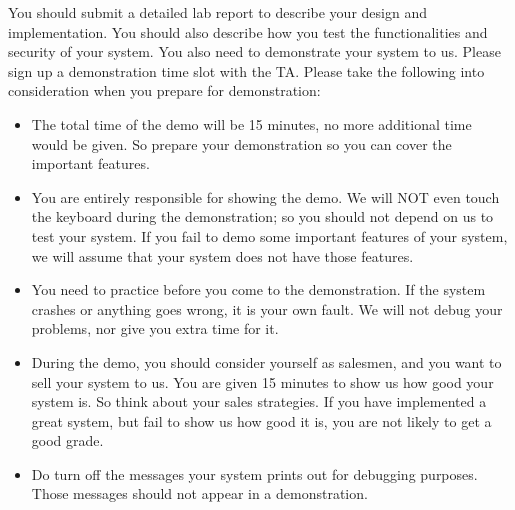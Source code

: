



You should submit a detailed lab report to describe your design and implementation.
You should also describe how you test the functionalities and
security of your system. You also need to demonstrate your system to us. 
Please sign up a demonstration time slot with the TA. Please take
the following into consideration when you prepare for demonstration:

\begin{itemize}

\item The total time of the demo will be 15 minutes, no more additional time would be
given. So prepare your demonstration so you can cover the important features.  

\item You are entirely responsible for showing the demo. 
We will NOT even touch the keyboard during the
demonstration; so you should not depend on us to test your system. If you fail to demo
some important features of your system, we will assume that your system does not
have those features. 

\item You need to practice before you come to the demonstration. 
If the system crashes or anything goes wrong, it is your own fault. We will not 
debug your problems, nor give you extra time for it. 

\item 
During the demo, you should consider yourself as salesmen, and you want to sell
your system to us. You are given 15 minutes to show us how good your system is.
So think about your sales strategies. If you have implemented a great system,
but fail to show us how good it is, you are not likely to get a good grade. 

\item 
Do turn off the messages your system prints out for debugging purposes. 
Those messages should not appear in a demonstration.


\end{itemize}


